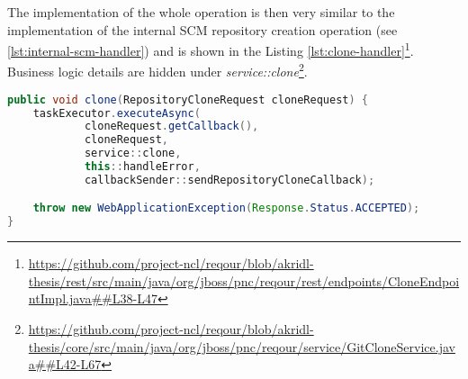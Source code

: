 \documentclass[../main.tex]{subfiles}
\begin{document}
The implementation of the whole operation is then very similar to the implementation of the internal SCM repository creation operation (see \ref{lst:internal-scm-handler}) and is shown in the Listing \ref{lst:clone-handler}\footnote{\url{https://github.com/project-ncl/reqour/blob/akridl-thesis/rest/src/main/java/org/jboss/pnc/reqour/rest/endpoints/CloneEndpointImpl.java##L38-L47}}. Business logic details are hidden under \textit{service::clone}\footnote{\url{https://github.com/project-ncl/reqour/blob/akridl-thesis/core/src/main/java/org/jboss/pnc/reqour/service/GitCloneService.java##L42-L67}}.

\begin{lstlisting}[language=Java, caption=Clone endpoint handler, label={lst:clone-handler}]
public void clone(RepositoryCloneRequest cloneRequest) {
    taskExecutor.executeAsync(
            cloneRequest.getCallback(),
            cloneRequest,
            service::clone,
            this::handleError,
            callbackSender::sendRepositoryCloneCallback);

    throw new WebApplicationException(Response.Status.ACCEPTED);
}
\end{lstlisting}
\end{document}
